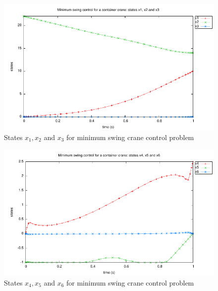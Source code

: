 \documentclass[a4paper,11pt]{report}    %
\newenvironment{shadedframe}{%
  \def\FrameCommand{\fcolorbox{black}{shadecolor}}%
  \MakeFramed {\FrameRestore}}
{\endMakeFramed}
\begin{document}
\begin{shadedframe}

\end{shadedframe}

\begin{figure}
  \centering 
  \includegraphics{../examples/crane/crane_states13}
  \caption{States $x_1, x_2$ and $x_3$ for minimum swing crane control problem}
 \label{fig:crane_states13}
\end{figure}

\begin{figure}
  \centering 
  \includegraphics{../examples/crane/crane_states46}
  \caption{States $x_4, x_5$ and $x_6$ for minimum swing crane control problem}
 \label{fig:crane_states46}
\end{figure}
\end{document}
